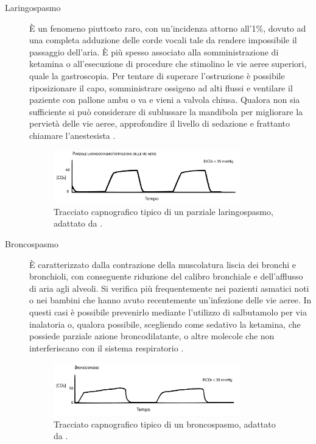 \begin{description}
\item[Laringospasmo] \`E un fenomeno piuttosto raro, con un'incidenza attorno all'1$\%$, dovuto ad una completa adduzione delle corde vocali tale da rendere impossibile il passaggio dell'aria. \`E più spesso associato alla somministrazione di ketamina o all'esecuzione di procedure che stimolino le vie aeree superiori, quale la gastroscopia. Per tentare di superare l'ostruzione è possibile riposizionare il capo, somministrare ossigeno ad alti flussi e ventilare il paziente con pallone ambu o va e vieni a valvola chiusa. Qualora non sia sufficiente si può considerare di sublussare la mandibola per migliorare la pervietà delle vie aeree, approfondire il livello di sedazione e frattanto chiamare l'anestesista \cite{Simeupsedazione}. 

\begin{figure}[h]
    \centering
    \includegraphics[width=0.8\textwidth]{Figure/laringospasmo.pdf}
    \caption{Tracciato capnografico tipico di un parziale laringospasmo, adattato da \cite{Baruch2005}.}
    \label{fig:laringo}
\end{figure}

\item[Broncospasmo] \`E caratterizzato dalla contrazione della muscolatura liscia dei bronchi e bronchioli, con conseguente riduzione del calibro bronchiale e dell'afflusso di aria agli alveoli. Si verifica più frequentemente nei pazienti asmatici noti o nei bambini che hanno avuto recentemente un'infezione delle vie aeree. In questi casi è possibile prevenirlo mediante l'utilizzo di salbutamolo per via inalatoria o, qualora possibile, scegliendo come sedativo la ketamina, che possiede parziale azione broncodilatante, o altre molecole che non interferiscano con il sistema respiratorio \cite{Simeupsedazione}.

\begin{figure}[h]
    \centering
    \includegraphics[width=0.8\textwidth]{Figure/broncospasmo.pdf}
    \caption{Tracciato capnografico tipico di un broncospasmo, adattato da \cite{Baruch2005}.}
    \label{fig:bronco}
\end{figure}

\end{description}

